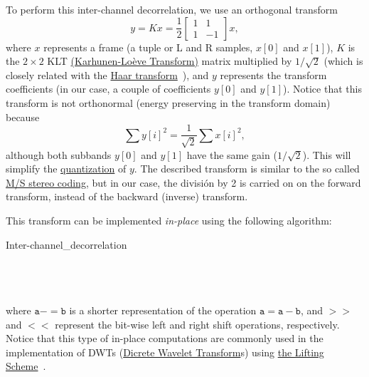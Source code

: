 To perform this inter-channel decorrelation, we use an orthogonal
transform
\begin{equation}
  y = Kx = \frac{1}{2}\begin{bmatrix} 1 & 1 \\ 1 & -1 \end{bmatrix}x,
\end{equation}
where $x$ represents a frame (a tuple or L and R samples, $x[0]$ and
$x[1]$), $K$ is the $2\times 2$ KLT
\href{http://fourier.eng.hmc.edu/e161/lectures/klt/node3.html}{(Karhunen-Lo\`eve
  Transform)} matrix multiplied by $1/\sqrt{2}$ (which is closely
related with the \href{http://wavelets.pybytes.com/wavelet/haar/}{Haar
  transform}~\cite{vetterli1995wavelets}), and $y$ represents the
transform coefficients (in our case, a couple of coefficients $y[0]$
and $y[1]$). Notice that this transform is not orthonormal (energy
preserving in the transform domain) because
\begin{equation}
  \sum y[i]^2 = \frac{1}{\sqrt{2}}\sum x[i]^2,
\end{equation}
although both subbands $y[0]$ and $y[1]$ have the same gain
($1/\sqrt{2}$). This will simplify the
\href{https://en.wikipedia.org/wiki/Quantization_(signal_processing)}{quantization}
of $y$. The described transform is similar to the so
called \href{https://en.wikipedia.org/wiki/Joint_encoding#M/S_stereo_coding}{M/S
stereo coding}, but in our case, the división by 2 is carried on on
the forward transform, instead of the backward (inverse) transform.

This transform can be implemented \emph{in-place} using the following
algorithm:

\begin{pseudocode}{Inter-channel\_decorrelation}{~}
  \BEGIN
     \\
     \\
  \END
  \ENDPROCEDURE
  \BEGIN
     \\
     \\
  \END
  \ENDPROCEDURE
\end{pseudocode}

where $\mathtt{a -= b}$ is a shorter representation of the operation
$\mathtt{a = a - b}$, and $\mathtt{>>}$ and $\mathtt{<<}$ represent
the bit-wise left and right shift operations, respectively. Notice
that this type of in-place computations are commonly used in the
implementation of DWTs
(\href{https://en.wikipedia.org/wiki/Discrete_wavelet_transform}{Dicrete
  Wavelet Transform}s) using
\href{https://cm-bell-labs.github.io/who/wim/papers/athome/athome.pdf}{the
  Lifting Scheme}~\cite{2006.sweldens}.

